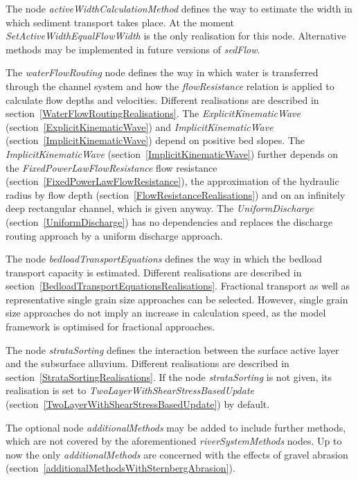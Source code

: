 \documentclass[11pt,a4paper]{article}
\begin{document}
The node \emph{activeWidthCalculationMethod} defines the way to estimate the width in which sediment transport takes place. At the moment \emph{SetActiveWidthEqualFlowWidth} is the only realisation for this node. Alternative methods may be implemented in future versions of \emph{sedFlow}.

The \emph{waterFlowRouting} node defines the way in which water is transferred through the channel system and how the \emph{flowResistance} relation is applied to calculate flow depths and velocities. Different realisations are described in section~\ref{WaterFlowRoutingRealisations}. The \emph{ExplicitKinematicWave} (section~\ref{ExplicitKinematicWave}) and \emph{ImplicitKinematicWave} (section~\ref{ImplicitKinematicWave}) depend on positive bed slopes. The \emph{ImplicitKinematicWave} (section~\ref{ImplicitKinematicWave}) further depends on the \emph{FixedPowerLawFlowResistance} flow resistance (section~\ref{FixedPowerLawFlowResistance}), the approximation of the hydraulic radius by flow depth (section~\ref{FlowResistanceRealisations}) and on an infinitely deep rectangular channel, which is given anyway. The \emph{UniformDischarge} (section~\ref{UniformDischarge}) has no dependencies and replaces the discharge routing approach by a uniform discharge approach.

The node \emph{bedloadTransportEquations} defines the way in which the bedload transport capacity is estimated. Different realisations are described in section~\ref{BedloadTransportEquationsRealisations}. Fractional transport as well as representative single grain size approaches can be selected. However, single grain size approaches do not imply an increase in calculation speed, as the model framework is optimised for fractional approaches.

The node \emph{strataSorting} defines the interaction between the surface active layer and the subsurface alluvium. Different realisations are described in section~\ref{StrataSortingRealisations}. If the node \emph{strataSorting} is not given, its realisation is set to \emph{TwoLayerWithShearStressBasedUpdate} (section~\ref{TwoLayerWithShearStressBasedUpdate}) by default.

The optional node \emph{additionalMethods} may be added to include further methods, which are not covered by the aforementioned \emph{riverSystemMethods} nodes. Up to now the only \emph{additionalMethods} are concerned with the effects of gravel abrasion (section~\ref{additionalMethodsWithSternbergAbrasion}).
\end{document}
